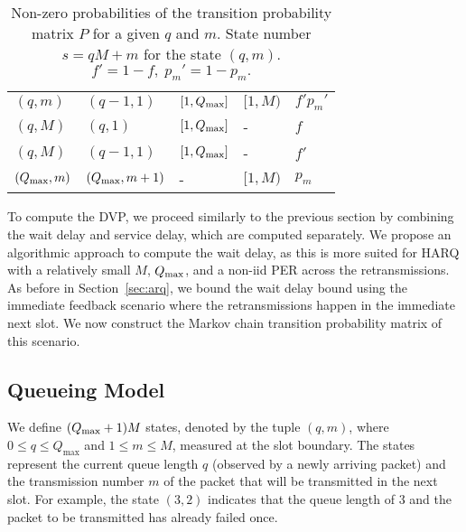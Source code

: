 \begin{table}[b]
\begin{tabular}{|l|l|l|l|l|}
$(q,m)$                                      & $(q-1,1)$                                        & $[1,Q_{\mathrm{max}}]$                & $[1,M)$                    & $f'p_m'$                    \\
$(q,M)$                                      & $(q,1)$                                          & $[1,Q_{\mathrm{max}}]$                &    -                       & $f$                         \\
$(q,M)$                                      & $(q-1,1)$                                        & $[1,Q_{\mathrm{max}}]$                &    -                       & $f'$                        \\
$(Q_{\mathrm{max}} ,m)$                                 & $(Q_{\mathrm{max}} ,m+1)$                                   &        -                   & $[1,M)$                    & $p_m$                       \\ \hline
\end{tabular}
\caption{Non-zero probabilities of the transition probability matrix $P$ for a given $q$ and $m$. State number $s=qM+m$ for the state $(q,m)$. $f'=1-f,\;p_m'=1-p_m.$}
\label{table:IR}
\end{table}

To compute the DVP, we proceed similarly to the previous section by combining the wait delay and service delay, which are computed separately. 
We propose an algorithmic approach to compute the wait delay, as this is more suited for HARQ with a relatively small $M$, $Q_{\mathrm{max}}$, and a non-iid PER across the retransmissions.
As before in Section~\ref{sec:arq}, we bound the wait delay bound using the immediate feedback scenario where the retransmissions happen in the immediate next slot.
We now construct the Markov chain transition probability matrix of this scenario.

\subsection{Queueing Model}
We define $(Q_{\mathrm{max}}+1)M$ states, denoted by the tuple $(q,m)$, where $0 \leq q \leq Q_{\mathrm{max}}$ and $1 \leq m \leq M$, measured at the slot boundary. The states represent the current queue length $q$ (observed by a newly arriving packet) and the transmission number $m$ of the packet that will be transmitted in the next slot. 
For example, the state $(3,2)$ indicates that the queue length of $3$ and the packet to be transmitted has already failed once. 


